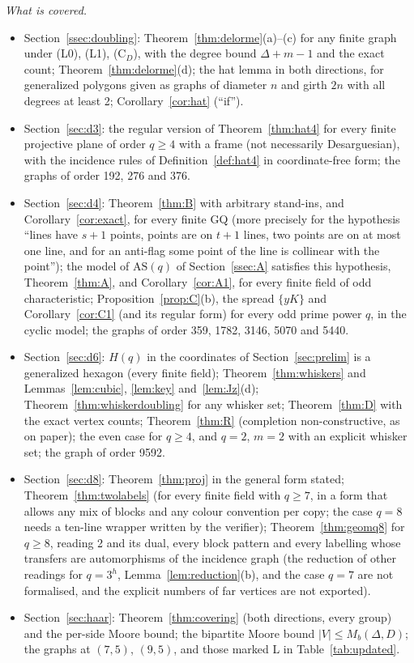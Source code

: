 \documentclass[11pt]{amsart}
\theoremstyle{definition}
\theoremstyle{remark}
\numberwithin{equation}{section}
\newcommand{\AS}{\mathrm{AS}}
\newcommand{\Mb}{M_b}
\begin{document}
\emph{What is covered.}
\begin{itemize}
\item Section~\ref{ssec:doubling}: Theorem~\ref{thm:delorme}(a)--(c) for any finite graph under (L0), (L1), (C$_D$), with the
  degree bound $\Delta+m-1$ and the exact count; Theorem~\ref{thm:delorme}(d); the hat lemma in both directions, for
  generalized polygons given as graphs of diameter $n$ and girth $2n$ with all degrees at least 2; Corollary~\ref{cor:hat}
  (``if'').
\item Section~\ref{sec:d3}: the regular version of Theorem~\ref{thm:hat4} for every finite projective plane of order $q\ge4$
  with a frame (not necessarily Desarguesian), with the incidence rules of Definition~\ref{def:hat4} in coordinate-free form;
  the graphs of order 192, 276 and 376.
\item Section~\ref{sec:d4}: Theorem~\ref{thm:B} with arbitrary stand-ins, and Corollary~\ref{cor:exact}, for every finite GQ
  (more precisely for the hypothesis ``lines have $s+1$ points, points are on $t+1$ lines, two points are on at most one
  line, and for an anti-flag some point of the line is collinear with the point''); the model of $\AS(q)$ of
  Section~\ref{ssec:A} satisfies this hypothesis, Theorem~\ref{thm:A}, and Corollary~\ref{cor:A1}, for every finite field of
  odd characteristic; Proposition~\ref{prop:C}(b), the spread $\{yK\}$ and Corollary~\ref{cor:C1} (and its regular form) for
  every odd prime power $q$, in the cyclic model; the graphs of order 359, 1782, 3146, 5070 and 5440.
\item Section~\ref{sec:d6}: $H(q)$ in the coordinates of Section~\ref{sec:prelim} is a generalized hexagon (every finite
  field); Theorem~\ref{thm:whiskers} and Lemmas~\ref{lem:cubic}, \ref{lem:key} and~\ref{lem:Jz}(d); Theorem~\ref{thm:whiskerdoubling}
  for any whisker set; Theorem~\ref{thm:D} with the exact vertex counts; Theorem~\ref{thm:R} (completion non-constructive, as on
  paper); the even case for $q\ge4$, and $q=2$, $m=2$ with an explicit whisker set; the graph of order 9592.
\item Section~\ref{sec:d8}: Theorem~\ref{thm:proj} in the general form stated; Theorem~\ref{thm:twolabels} (for every finite
  field with $q\ge7$, in a form that allows any mix of blocks and any colour convention per copy; the case $q=8$ needs a
  ten-line wrapper written by the verifier); Theorem~\ref{thm:geomq8} for $q\ge8$, reading 2 and its dual, every block pattern
  and every labelling whose transfers are automorphisms of the incidence graph (the reduction of other readings for $q=3^h$,
  Lemma~\ref{lem:reduction}(b), and the case $q=7$ are not formalised, and the explicit numbers of far vertices are not exported).
\item Section~\ref{sec:haar}: Theorem~\ref{thm:covering} (both directions, every group) and the per-side Moore bound; the
  bipartite Moore bound $|V|\le\Mb(\Delta,D)$; the graphs at $(7,5)$, $(9,5)$, and those marked \textsf L in
  Table~\ref{tab:updated}.
\end{itemize}
\end{document}
